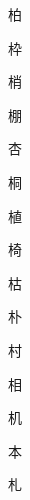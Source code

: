\begin{spacing}{2.5}
{\Huge \begin{CJK}{UTF8}{min} 柏\end{CJK}}\hspace{0.1cm}
{\Huge \begin{CJK}{UTF8}{min} 枠\end{CJK}}\hspace{0.1cm}
{\Huge \begin{CJK}{UTF8}{min} 梢\end{CJK}}\hspace{0.1cm}
{\Huge \begin{CJK}{UTF8}{min} 棚\end{CJK}}\hspace{0.1cm}
{\Huge \begin{CJK}{UTF8}{min} 杏\end{CJK}}\hspace{0.1cm}
{\Huge \begin{CJK}{UTF8}{min} 桐\end{CJK}}\hspace{0.1cm}
{\Huge \begin{CJK}{UTF8}{min} 植\end{CJK}}\hspace{0.1cm}
{\Huge \begin{CJK}{UTF8}{min} 椅\end{CJK}}\hspace{0.1cm}
{\Huge \begin{CJK}{UTF8}{min} 枯\end{CJK}}\hspace{0.1cm}
{\Huge \begin{CJK}{UTF8}{min} 朴\end{CJK}}\hspace{0.1cm}
{\Huge \begin{CJK}{UTF8}{min} 村\end{CJK}}\hspace{0.1cm}
{\Huge \begin{CJK}{UTF8}{min} 相\end{CJK}}\hspace{0.1cm}
{\Huge \begin{CJK}{UTF8}{min} 机\end{CJK}}\hspace{0.1cm}
{\Huge \begin{CJK}{UTF8}{min} 本\end{CJK}}\hspace{0.1cm}
{\Huge \begin{CJK}{UTF8}{min} 札\end{CJK}}\hspace{0.1cm}

\end{spacing}
